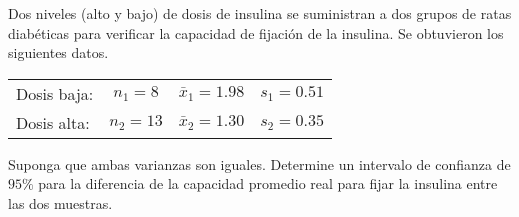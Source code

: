 \begin{enunciado}
 Dos niveles (alto y bajo) de dosis de insulina se suministran a dos grupos de ratas diab\'eticas para verificar la capacidad de fijaci\'on de la insulina. Se obtuvieron los siguientes datos.
 \begin{center}
  \begin{tabular}{lccc}
   Dosis baja: & $n_1 = 8$ & $\bar{x}_1 = 1.98$ & $s_1 = 0.51$ \\
   Dosis alta: & $n_2 = 13$ & $\bar{x}_2 = 1.30$ & $s_2 = 0.35$
  \end{tabular}
 \end{center}
 Suponga que ambas varianzas son iguales. Determine un intervalo de confianza de $95\%$ para la diferencia de la capacidad promedio real para fijar la insulina entre las dos muestras.
\end{enunciado}

